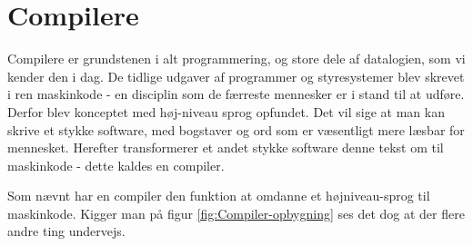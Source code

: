 \section{Compilere}
Compilere er grundstenen i alt programmering, og store dele af datalogien, som vi kender den i dag. De tidlige udgaver af programmer og styresystemer blev skrevet i ren maskinkode - en disciplin som de færreste mennesker er i stand til at udføre. Derfor blev konceptet med høj-niveau sprog opfundet. Det vil sige at man kan skrive et stykke software, med bogstaver og ord som er væsentligt mere læsbar for mennesket. Herefter transformerer et andet stykke software denne tekst om til maskinkode - dette kaldes en compiler.


\noindent Som nævnt har en compiler den funktion at omdanne et højniveau-sprog til maskinkode. Kigger man på figur \ref{fig:Compiler-opbygning} ses det dog at der flere andre ting undervejs.